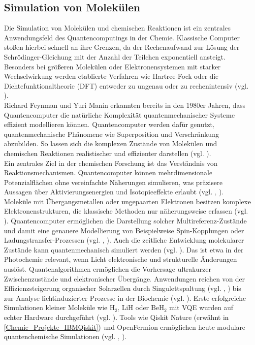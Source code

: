\subsection{Simulation von Molekülen}
\label{Chemie_Simulation_Moleküle}
{Die Simulation von Molekülen und chemischen Reaktionen ist ein zentrales Anwendungsfeld des Quantencomputings in der Chemie. Klassische Computer stoßen hierbei schnell an ihre Grenzen, da der Rechenaufwand zur Lösung der Schrödinger-Gleichung mit der Anzahl der Teilchen exponentiell ansteigt. Besonders bei größeren Molekülen oder Elektronensystemen mit starker Wechselwirkung werden etablierte Verfahren wie Hartree-Fock oder die Dichtefunktionaltheorie (DFT) entweder zu ungenau oder zu rechenintensiv (vgl. \cite{bauer_quantum_2020}).}
\newline\\
{Richard Feynman und Yuri Manin erkannten bereits in den 1980er Jahren, dass Quantencomputer die natürliche Komplexität quantenmechanischer Systeme effizient modellieren können. Quantencomputer werden dafür genutzt, quantenmechanische Phänomene wie Superposition und Verschränkung abzubilden. So lassen sich die komplexen Zustände von Molekülen und chemischen Reaktionen realistischer und effizienter darstellen (vgl. \cite{feynmanSimulatingPhysicsComputers1982}).}
\newline\\
Ein zentrales Ziel in der chemischen Forschung ist das Verständnis von Reaktionsmechanismen. Quantencomputer können mehrdimensionale Potenzialflächen ohne vereinfachte Näherungen simulieren, was präzisere Aussagen über Aktivierungsenergien und Isotopieeffekte erlaubt (vgl. \cite{liu_quantum_2020}, \cite{mcardle_quantum_2020}). Moleküle mit Übergangsmetallen oder ungepaarten Elektronen besitzen komplexe Elektronenstrukturen, die klassische Methoden nur näherungsweise erfassen (vgl. \cite{weidman_quantum_2024}). Quantencomputer ermöglichen die Darstellung solcher Multireferenz-Zustände und damit eine genauere Modellierung von Beispielweise Spin-Kopplungen oder Ladungstransfer-Prozessen (vgl. \cite{bauer_quantum_2020}, \cite{mcardle_quantum_2020}). Auch die zeitliche Entwicklung molekularer Zustände kann quantenmechanisch simuliert werden (vgl. \cite{bauer_quantum_2020}). Das ist etwa in der Photochemie relevant, wenn Licht elektronische und strukturelle Änderungen auslöst. Quantenalgorithmen ermöglichen die Vorhersage ultrakurzer Zwischenzustände und elektronischer Übergänge. Anwendungen reichen von der Effizienzsteigerung organischer Solarzellen durch Singulettspaltung (vgl. \cite{motlagh_quantum_2025}, \cite{baldacchino_singlet_2022}) bis zur Analyse lichtinduzierter Prozesse in der Biochemie (vgl. \cite{macdonell_predicting_2023}). Erste erfolgreiche Simulationen kleiner Moleküle wie H$_2$, LiH oder BeH$_2$ mit VQE wurden auf echter Hardware durchgeführt (vgl. \cite{kandala_hardware-efficient_2017}). Tools wie Qiskit Nature (erwähnt in \ref{Chemie_Projekte_IBMQiskit}) und OpenFermion ermöglichen heute modulare quantenchemische Simulationen (vgl. \cite{the_qiskit_nature_development_team_qiskit_2023}, \cite{mcardle_quantum_2020}).


